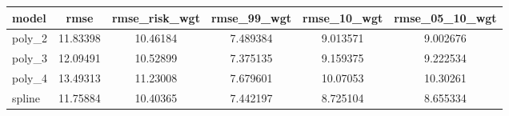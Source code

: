 \documentclass[]{article}
\begin{document}
\begin{tabular}{lccccc} \hline
model & rmse & rmse\_risk\_wgt & rmse\_99\_wgt & rmse\_10\_wgt & rmse\_05\_10\_wgt \\ \hline
poly\_2 & 11.83398 & 10.46184 & 7.489384 & 9.013571 & 9.002676 \\
poly\_3 & 12.09491 & 10.52899 & 7.375135 & 9.159375 & 9.222534 \\
poly\_4 & 13.49313 & 11.23008 & 7.679601 & 10.07053 & 10.30261 \\
 spline & 11.75884 & 10.40365 & 7.442197 & 8.725104 & 8.655334 \\ \hline
\end{tabular}
\end{document}
